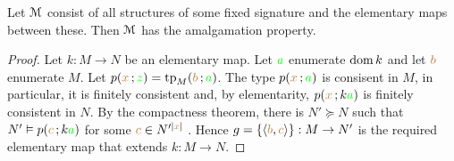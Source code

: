 \documentclass[creche.tex]{subfiles}
\begin{document}
\begin{proposition}\label{prop_elementary_amalg}
Let $\EuScript M$ consist of all structures of some fixed signature and the elementary maps between these. Then $\EuScript M$ has the amalgamation property.
\end{proposition}

\begin{proof}
Let $k:M\to N$ be an elementary map. Let ${\color{green} a}$ enumerate $\mathop{\rm dom} k$ and let ${\color{brown} b}$ enumerate $M$. Let $p({\color{brown} x}\,;{\color{green} z})={\rm tp}_M({\color{brown} b}\,;{\color{green} a})$. The type $p({\color{brown} x}\,;{\color{green} a})$ is consisent in $M$, in particular, it is finitely consistent and, by elementarity,  $p({\color{brown} x}\,;k{\color{green} a})$ is finitely consistent in $N$. By the compactness theorem, there is $N'\succeq N$ such that $N'\vDash p({\color{brown} c}\,;k{\color{green} a})$ for some ${\color{brown} c}\in N'^{|{\color{brown} x}|}$ . Hence $g=\{\langle{\color{brown}b},{\color{brown} c}\rangle\}:M\to N'$ is the required elementary map that extends $k:M\to N$.
\end{proof}
% 
% 
% 
% 
%    
% 
\end{document}
